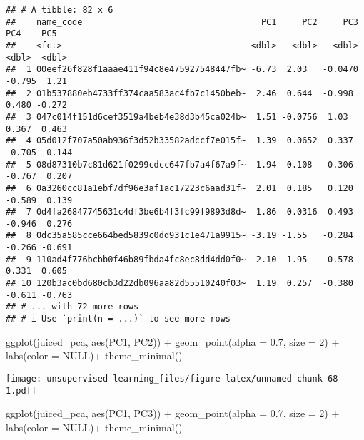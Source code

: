 \documentclass[
]{article}
\newenvironment{Shaded}{\begin{snugshade}}{\end{snugshade}}
\newcommand{\AttributeTok}[1]{\textcolor[rgb]{0.77,0.63,0.00}{#1}}
\newcommand{\ConstantTok}[1]{\textcolor[rgb]{0.00,0.00,0.00}{#1}}
\newcommand{\DecValTok}[1]{\textcolor[rgb]{0.00,0.00,0.81}{#1}}
\newcommand{\FloatTok}[1]{\textcolor[rgb]{0.00,0.00,0.81}{#1}}
\newcommand{\FunctionTok}[1]{\textcolor[rgb]{0.00,0.00,0.00}{#1}}
\newcommand{\NormalTok}[1]{#1}
\newcommand{\SpecialCharTok}[1]{\textcolor[rgb]{0.00,0.00,0.00}{#1}}
\begin{document}
\begin{verbatim}
## # A tibble: 82 x 6
##    name_code                                   PC1     PC2     PC3    PC4    PC5
##    <fct>                                     <dbl>   <dbl>   <dbl>  <dbl>  <dbl>
##  1 00eef26f828f1aaae411f94c8e475927548447fb~ -6.73  2.03   -0.0470 -0.795  1.21 
##  2 01b537880eb4733ff374caa583ac4fb7c1450beb~  2.46  0.644  -0.998   0.480 -0.272
##  3 047c014f151d6cef3519a4beb4e38d3b45ca024b~  1.51 -0.0756  1.03    0.367  0.463
##  4 05d012f707a50ab936f3d52b33582adccf7e015f~  1.39  0.0652  0.337  -0.705 -0.144
##  5 08d87310b7c81d621f0299cdcc647fb7a4f67a9f~  1.94  0.108   0.306  -0.767  0.207
##  6 0a3260cc81a1ebf7df96e3af1ac17223c6aad31f~  2.01  0.185   0.120  -0.589  0.139
##  7 0d4fa26847745631c4df3be6b4f3fc99f9893d8d~  1.86  0.0316  0.493  -0.946  0.276
##  8 0dc35a585cce664bed5839c0dd931c1e471a9915~ -3.19 -1.55   -0.284  -0.266 -0.691
##  9 110ad4f776bcbb0f46b89fbda4fc8ec8dd4dd0f0~ -2.10 -1.95    0.578   0.331  0.605
## 10 120b3ac0bd680cb3d22db096aa82d55510240f03~  1.19  0.257  -0.380  -0.611 -0.763
## # ... with 72 more rows
## # i Use `print(n = ...)` to see more rows
\end{verbatim}

\begin{Shaded}
\begin{Highlighting}[]
  \FunctionTok{ggplot}\NormalTok{(juiced\_pca, }\FunctionTok{aes}\NormalTok{(PC1, PC2)) }\SpecialCharTok{+}
  \FunctionTok{geom\_point}\NormalTok{(}\AttributeTok{alpha =} \FloatTok{0.7}\NormalTok{, }\AttributeTok{size =} \DecValTok{2}\NormalTok{) }\SpecialCharTok{+}
  \FunctionTok{labs}\NormalTok{(}\AttributeTok{color =} \ConstantTok{NULL}\NormalTok{)}\SpecialCharTok{+}
  \FunctionTok{theme\_minimal}\NormalTok{()}
\end{Highlighting}
\end{Shaded}

\texttt{[image: unsupervised-learning\_files/figure-latex/unnamed-chunk-68-1.pdf]}

\begin{Shaded}
\begin{Highlighting}[]
  \FunctionTok{ggplot}\NormalTok{(juiced\_pca, }\FunctionTok{aes}\NormalTok{(PC1, PC3)) }\SpecialCharTok{+}
  \FunctionTok{geom\_point}\NormalTok{(}\AttributeTok{alpha =} \FloatTok{0.7}\NormalTok{, }\AttributeTok{size =} \DecValTok{2}\NormalTok{) }\SpecialCharTok{+}
  \FunctionTok{labs}\NormalTok{(}\AttributeTok{color =} \ConstantTok{NULL}\NormalTok{)}\SpecialCharTok{+}
  \FunctionTok{theme\_minimal}\NormalTok{()}
\end{Highlighting}
\end{Shaded}
\end{document}
